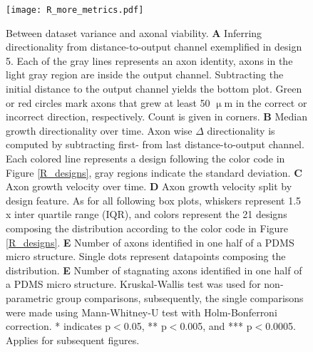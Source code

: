 \begin{figure}[h!]
    \texttt{[image: R\_more\_metrics.pdf]}
    \caption[Between dataset variance and axonal viability]
        {Between dataset variance and axonal viability. \textbf{A} Inferring
        directionality from distance-to-output channel exemplified in design 5.
        Each of the gray lines represents an axon identity, axons in the light
        gray region are inside the output channel. Subtracting the initial
        distance to the output channel yields the bottom plot. Green or red
        circles mark axons that grew at least 50 $\upmu$m in the correct or
        incorrect direction, respectively. Count is given in corners. \textbf{B}
        Median growth directionality over time. Axon wise $\Delta$
        directionality is computed by subtracting first- from last
        distance-to-output channel. Each colored line represents a design
        following the color code in Figure \ref{R_designs}, gray regions
        indicate the standard deviation. \textbf{C} Axon growth velocity over
        time. \textbf{D} Axon growth velocity split by design feature. As for
        all following box plots, whiskers represent 1.5 x inter quartile range
        (IQR), and colors represent the 21 designs composing the distribution
        according to the color code in Figure \ref{R_designs}. \textbf{E} Number
        of axons identified in one half of a PDMS micro structure. Single dots
        represent datapoints composing the distribution. \textbf{E} Number of
        stagnating axons identified in one half of a PDMS micro structure.
        Kruskal-Wallis test was used for non-parametric group comparisons,
        subsequently, the single comparisons were made using Mann-Whitney-U test
        with Holm-Bonferroni correction. * indicates p$<$0.05, ** p$<$0.005, and
        *** p$<$0.0005. Applies for subsequent figures.} 
    \label{R_more_metrics}
\end{figure}





